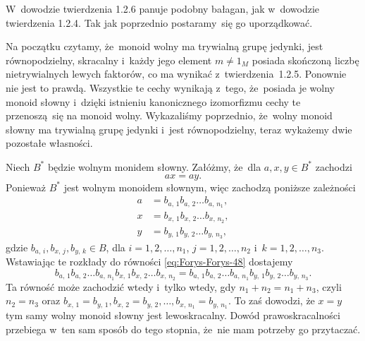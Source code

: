 \documentclass[a4paper,11pt]{article}
\begin{document}
\vspace{\spaceFour}





\start {} W~dowodzie twierdzenia 1.2.6 panuje podobny bałagan, jak
w~dowodzie twierdzenia 1.2.4. Tak jak poprzednio postaramy~się go
uporządkować.

Na początku czytamy, że~monoid wolny ma trywialną grupę jedynki, jest
równopodzielny, skracalny i~każdy jego element $m \neq 1_{ M }$ posiada
skończoną liczbę nietrywialnych lewych faktorów, co ma wynikać
z~twierdzenia~1.2.5. Ponownie nie jest to prawdą. Wszystkie te cechy
wynikają z~tego, że~posiada je wolny monoid słowny i~dzięki istnieniu
kanonicznego izomorfizmu cechy te przenoszą~się na monoid wolny.
Wykazaliśmy poprzednio, że~wolny monoid słowny ma trywialną grupę jedynki
i~jest równopodzielny, teraz wykażemy dwie pozostałe własności.

Niech $B^{ * }$ będzie wolnym monidem słowny. Załóżmy, że~dla
$a, x, y \in B^{ * }$ zachodzi
\begin{equation}
  \label{eq:Forys-Forys-48}
  a x = a y.
\end{equation}
Ponieważ $B^{ * }$ jest wolnym monoidem słownym, więc zachodzą poniższe zależności
\begin{subequations}
  \begin{align}
    \label{eq:Forys-Forys-49-A}
    a &= b_{ a,\, 1 } b_{ a,\, 2 } \ldots b_{ a,\, n_{ 1 } }, \\
    \label{eq:Forys-Forys-49-B}
    x &= b_{ x,\, 1 } b_{ x,\, 2 } \ldots b_{ x,\, n_{ 2 } }, \\
    \label{eq:Forys-Forys-49-C}
    y &= b_{ y,\, 1 } b_{ y,\, 2 } \ldots b_{ y,\, n_{ 3 } },
  \end{align}
\end{subequations}
gdzie $b_{ a,\, i }, b_{ x,\, j }, b_{ y,\, k } \in B$, dla $i = 1, 2, \ldots, n_{ 1 }$,
$j = 1, 2, \ldots, n_{ 2 }$ i~$k = 1, 2, \ldots, n_{ 3 }$. Wstawiając te rozkłady do
równości \eqref{eq:Forys-Forys-48} dostajemy
\begin{equation}
  \label{eq:Forys-Forys-50}
  b_{ a,\, 1 } b_{ a,\, 2 } \ldots b_{ a,\, n_{ 1 } } b_{ x,\, 1 }
  b_{ x,\, 2 } \ldots b_{ x,\, n_{ 2 } }
  =
  b_{ a,\, 1 } b_{ a,\, 2 } \ldots b_{ a,\, n_{ 1 } } b_{ y,\, 1 }
  b_{ y,\, 2 } \ldots b_{ y,\, n_{ 3 } }.
\end{equation}
Ta równość może zachodzić wtedy i~tylko wtedy, gdy
$n_{ 1 } + n_{ 2 } = n_{ 1 } + n_{ 3 }$, czyli $n_{ 2 } = n_{ 3 }$
oraz $b_{ x,\, 1 } = b_{ y,\, 1 }, b_{ x,\, 2 } = b_{ y,\, 2 }, \ldots,
b_{ x,\, n_{ 1 } } = b_{ y,\, n_{ 1 } }$. To zaś dowodzi, że $x = y$ tym samy
wolny monoid słowny jest lewoskracalny. Dowód prawoskracalności przebiega
w~ten sam sposób do tego stopnia, że~nie mam potrzeby go przytaczać.
\end{document}
